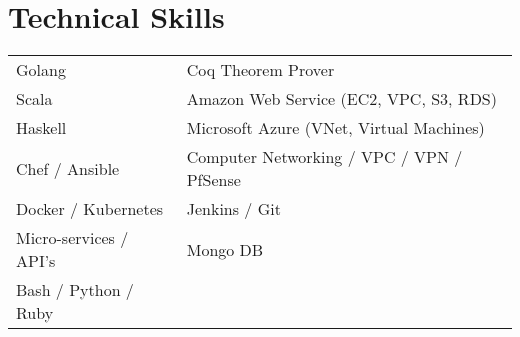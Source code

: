 \section{Technical Skills}
\begin{tabularx}{\linewidth}{@{}l X@{}}
Golang &  Coq Theorem Prover \\
Scala & Amazon Web Service (EC2, VPC, S3, RDS) \\
Haskell & Microsoft Azure (VNet, Virtual Machines) \\
Chef / Ansible & Computer Networking / VPC / VPN / PfSense \\
Docker / Kubernetes & Jenkins / Git \\
Micro-services / API’s  &  Mongo DB \\
Bash / Python / Ruby & \\
\end{tabularx}
